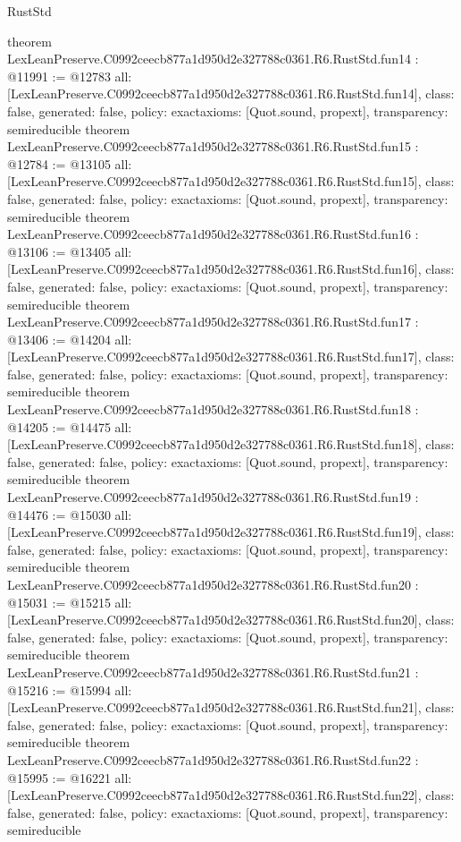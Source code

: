 \begin{lexlean}{RustStd}
\begin{coremodule}
{}
theorem LexLeanPreserve.C0992ceecb877a1d950d2e327788c0361.R6.RustStd.fun14 : @11991 := @12783 {
  all: [LexLeanPreserve.C0992ceecb877a1d950d2e327788c0361.R6.RustStd.fun14],
  class: false,
  generated: false,
  policy: exact{axioms: [Quot.sound, propext]},
  transparency: semireducible
}
theorem LexLeanPreserve.C0992ceecb877a1d950d2e327788c0361.R6.RustStd.fun15 : @12784 := @13105 {
  all: [LexLeanPreserve.C0992ceecb877a1d950d2e327788c0361.R6.RustStd.fun15],
  class: false,
  generated: false,
  policy: exact{axioms: [Quot.sound, propext]},
  transparency: semireducible
}
theorem LexLeanPreserve.C0992ceecb877a1d950d2e327788c0361.R6.RustStd.fun16 : @13106 := @13405 {
  all: [LexLeanPreserve.C0992ceecb877a1d950d2e327788c0361.R6.RustStd.fun16],
  class: false,
  generated: false,
  policy: exact{axioms: [Quot.sound, propext]},
  transparency: semireducible
}
theorem LexLeanPreserve.C0992ceecb877a1d950d2e327788c0361.R6.RustStd.fun17 : @13406 := @14204 {
  all: [LexLeanPreserve.C0992ceecb877a1d950d2e327788c0361.R6.RustStd.fun17],
  class: false,
  generated: false,
  policy: exact{axioms: [Quot.sound, propext]},
  transparency: semireducible
}
theorem LexLeanPreserve.C0992ceecb877a1d950d2e327788c0361.R6.RustStd.fun18 : @14205 := @14475 {
  all: [LexLeanPreserve.C0992ceecb877a1d950d2e327788c0361.R6.RustStd.fun18],
  class: false,
  generated: false,
  policy: exact{axioms: [Quot.sound, propext]},
  transparency: semireducible
}
theorem LexLeanPreserve.C0992ceecb877a1d950d2e327788c0361.R6.RustStd.fun19 : @14476 := @15030 {
  all: [LexLeanPreserve.C0992ceecb877a1d950d2e327788c0361.R6.RustStd.fun19],
  class: false,
  generated: false,
  policy: exact{axioms: [Quot.sound, propext]},
  transparency: semireducible
}
theorem LexLeanPreserve.C0992ceecb877a1d950d2e327788c0361.R6.RustStd.fun20 : @15031 := @15215 {
  all: [LexLeanPreserve.C0992ceecb877a1d950d2e327788c0361.R6.RustStd.fun20],
  class: false,
  generated: false,
  policy: exact{axioms: [Quot.sound, propext]},
  transparency: semireducible
}
theorem LexLeanPreserve.C0992ceecb877a1d950d2e327788c0361.R6.RustStd.fun21 : @15216 := @15994 {
  all: [LexLeanPreserve.C0992ceecb877a1d950d2e327788c0361.R6.RustStd.fun21],
  class: false,
  generated: false,
  policy: exact{axioms: [Quot.sound, propext]},
  transparency: semireducible
}
theorem LexLeanPreserve.C0992ceecb877a1d950d2e327788c0361.R6.RustStd.fun22 : @15995 := @16221 {
  all: [LexLeanPreserve.C0992ceecb877a1d950d2e327788c0361.R6.RustStd.fun22],
  class: false,
  generated: false,
  policy: exact{axioms: [Quot.sound, propext]},
  transparency: semireducible
}
\end{coremodule}
\end{lexlean}
